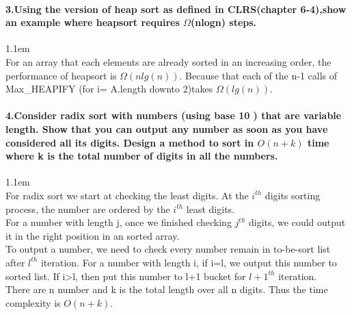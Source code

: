 \documentclass[11pt]{article}
\begin{document}
\paragraph{3.Using the version of heap sort as defined in CLRS(chapter 6-4),show an example where heapsort requires $\Omega$(nlogn) steps. }
\hangindent 1.1em
\noindent
\\For an array that each elements are already sorted in an increasing order, the performance of heapsort is $\Omega (nlg(n))$. Because that each of the n-1 calls of Max\_HEAPIFY (for i= A.length downto 2)takes $\Omega (lg(n))$.
\\
\paragraph{4.Consider radix sort with numbers (using base 10 ) that are variable length. Show that you can output any number as soon as you have considered all its digits.
Design a method to sort in $O(n + k)$ time where k is the total number of digits in all the numbers.}
\hangindent 1.1em
\noindent
\\For radix sort we start at checking the least digits. At the $i^{th}$ digits sorting process, the number are ordered by the $i^{th}$ least digits.
\\For a number with length j, once we finished checking $j^{th}$ digits, we could output it in the right position in an sorted array.
\\To output a number, we need to check every number remain in to-be-sort list after $l^{th}$ iteration. For a number with length i, if i=l, we output this number to sorted list. If i>l, then put this number to l+1 bucket for $l+1^{th}$ iteration.
\\There are n number and k is the total length over all n digits. Thus the time complexity is  $O(n+k)$.
\\
\end{document}
